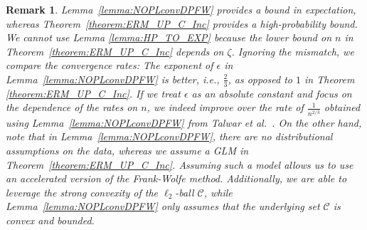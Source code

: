 \documentclass{article}
\newtheorem{remark}{\textbf{Remark}}
\begin{document}
\begin{remark}
\label{remark:Best_q_ERM}
Lemma~\ref{lemma:NOPLconvDPFW} provides a bound in expectation, whereas Theorem~\ref{theorem:ERM_UP_C_Inc} provides a high-probability bound. We cannot use Lemma \ref{lemma:HP_TO_EXP} because the lower bound on $n$ in Theorem~\ref{theorem:ERM_UP_C_Inc} depends on $\zeta$.
Ignoring the mismatch, we compare the convergence rates: The exponent of $\epsilon$ in Lemma~\ref{lemma:NOPLconvDPFW} is better, i.e., $\frac{2}{3}$, as opposed to $1$ in Theorem \ref{theorem:ERM_UP_C_Inc}. If we treat $\epsilon$ as an absolute constant and focus on the dependence of the rates on $n$, we indeed improve over the rate of $\frac{1}{n^{2/3}}$ obtained using Lemma~\ref{lemma:NOPLconvDPFW} from Talwar et al.~\cite{NOPL}.
On the other hand, note that in Lemma~\ref{lemma:NOPLconvDPFW}, there are no distributional assumptions on the data, whereas we assume a GLM in Theorem~\ref{theorem:ERM_UP_C_Inc}. Assuming such a model allows us to use an accelerated version of the Frank-Wolfe method. Additionally, we are able to leverage the strong convexity of the $\ell_2$-ball $\mathcal{C}$, while Lemma~\ref{lemma:NOPLconvDPFW} only assumes that the underlying set $\mathcal{C}$ is convex and bounded. %
\end{remark}

\end{document}
